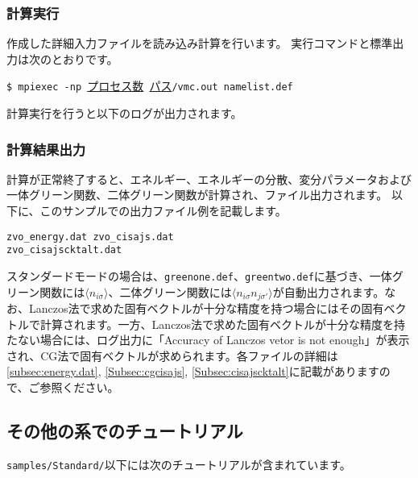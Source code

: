 \subsubsection{計算実行}
作成した詳細入力ファイルを読み込み計算を行います。
実行コマンドと標準出力は次のとおりです。

\vspace{1cm}\hspace{-0.7cm}
\verb|$ mpiexec -np |\underline{プロセス数}\verb| |\underline{パス}\verb|/vmc.out namelist.def|
\small

計算実行を行うと以下のログが出力されます。

\subsubsection{計算結果出力}
計算が正常終了すると、エネルギー、エネルギーの分散、変分パラメータおよび一体グリーン関数、二体グリーン関数が計算され、ファイル出力されます。
以下に、このサンプルでの出力ファイル例を記載します。\\
\begin{minipage}{12cm}
\begin{screen}
\begin{verbatim}
zvo_energy.dat zvo_cisajs.dat 
zvo_cisajscktalt.dat  
\end{verbatim}
\end{screen}
\end{minipage}

スタンダードモードの場合は、\verb|greenone.def|、\verb|greentwo.def|に基づき、一体グリーン関数には$\langle n_{i\sigma} \rangle$、二体グリーン関数には$\langle n_{i\sigma} n_{j\sigma'} \rangle$が自動出力されます。なお、Lanczos法で求めた固有ベクトルが十分な精度を持つ場合にはその固有ベクトルで計算されます。一方、Lanczos法で求めた固有ベクトルが十分な精度を持たない場合には、ログ出力に「Accuracy of Lanczos vetor is not enough」が表示され、CG法で固有ベクトルが求められます。各ファイルの詳細は\ref{subsec:energy.dat}, \ref{Subsec:cgcisajs}, \ref{Subsec:cisajscktalt}に記載がありますので、ご参照ください。


\subsection{その他の系でのチュートリアル}

\verb|samples/Standard/|以下には次のチュートリアルが含まれています。

